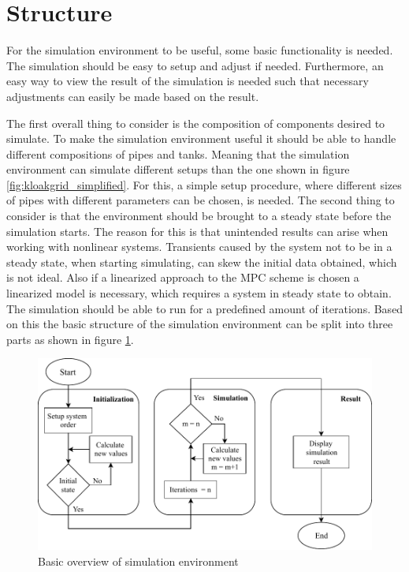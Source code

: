 \section{Structure}\label{sec:Structure}
For the simulation environment to be useful, some basic functionality is needed. The simulation should be easy to setup and adjust if needed. 
Furthermore, an easy way to view the result of the simulation is needed such that necessary adjustments can easily be made based on the result.

The first overall thing to consider is the composition of components desired to simulate. 
To make the simulation environment useful it should be able to handle different compositions of pipes and tanks. Meaning that the simulation environment can simulate different setups than the one shown in figure \ref{fig:kloakgrid_simplified}. For this, a simple setup procedure, where different sizes of pipes with different parameters can be chosen, is needed. 
The second thing to consider is that the environment should be brought to a steady state before the simulation starts. The reason for this is that unintended results can arise when working with nonlinear systems. Transients caused by the system not to be in a steady state, when starting simulating, can skew the initial data obtained, which is not ideal.   
Also if a linearized approach to the MPC scheme is chosen a linearized model is necessary, which requires a system in steady state to obtain. 
The simulation should be able to run for a predefined amount of iterations. 
Based on this the basic structure of the simulation environment can be split into three parts as shown in figure \ref{fig:struct_overview}.

\begin{figure}[H]
\centering
\includegraphics[width=0.9 \textwidth]{report/simulation/pictures/struct_overview_v2.pdf}
\caption{Basic overview of simulation environment}
\label{fig:struct_overview}
\end{figure}


